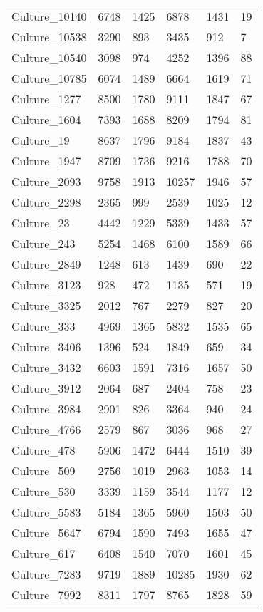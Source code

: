 \begin{longtable}{|P{3.5cm}|P{2cm}|P{2cm}|P{2cm}|P{2cm}|P{2cm}|}
Culture\_10140 & 6748 & 1425 & 6878 & 1431 &  19 \\ 
Culture\_10538 & 3290 & 893 & 3435 & 912 &   7 \\ 
Culture\_10540 & 3098 & 974 & 4252 & 1396 &  88 \\ 
Culture\_10785 & 6074 & 1489 & 6664 & 1619 &  71 \\ 
Culture\_1277 & 8500 & 1780 & 9111 & 1847 &  67 \\ 
Culture\_1604 & 7393 & 1688 & 8209 & 1794 &  81 \\ 
Culture\_19 & 8637 & 1796 & 9184 & 1837 &  43 \\ 
Culture\_1947 & 8709 & 1736 & 9216 & 1788 &  70 \\ 
Culture\_2093 & 9758 & 1913 & 10257 & 1946 &  57 \\ 
Culture\_2298 & 2365 & 999 & 2539 & 1025 &  12 \\ 
Culture\_23 & 4442 & 1229 & 5339 & 1433 &  57 \\ 
Culture\_243 & 5254 & 1468 & 6100 & 1589 &  66 \\ 
Culture\_2849 & 1248 & 613 & 1439 & 690 &  22 \\ 
Culture\_3123 & 928 & 472 & 1135 & 571 &  19 \\ 
Culture\_3325 & 2012 & 767 & 2279 & 827 &  20 \\ 
Culture\_333 & 4969 & 1365 & 5832 & 1535 &  65 \\ 
Culture\_3406 & 1396 & 524 & 1849 & 659 &  34 \\ 
Culture\_3432 & 6603 & 1591 & 7316 & 1657 &  50 \\ 
Culture\_3912 & 2064 & 687 & 2404 & 758 &  23 \\ 
Culture\_3984 & 2901 & 826 & 3364 & 940 &  24 \\ 
Culture\_4766 & 2579 & 867 & 3036 & 968 &  27 \\ 
Culture\_478 & 5906 & 1472 & 6444 & 1510 &  39 \\ 
Culture\_509 & 2756 & 1019 & 2963 & 1053 &  14 \\ 
Culture\_530 & 3339 & 1159 & 3544 & 1177 &  12 \\ 
Culture\_5583 & 5184 & 1365 & 5960 & 1503 &  50 \\ 
Culture\_5647 & 6794 & 1590 & 7493 & 1655 &  47 \\ 
Culture\_617 & 6408 & 1540 & 7070 & 1601 &  45 \\ 
Culture\_7283 & 9719 & 1889 & 10285 & 1930 &  62 \\ 
Culture\_7992 & 8311 & 1797 & 8765 & 1828 &  59 \\ 

\end{longtable}
